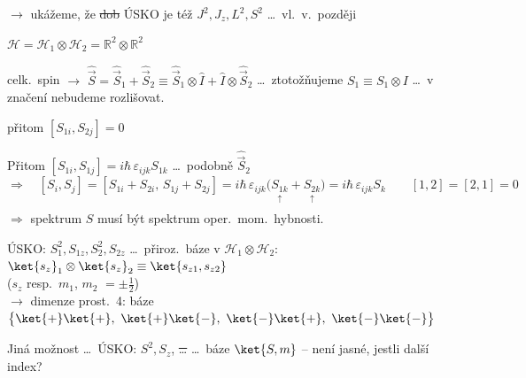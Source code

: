 $\to$ ukážeme, že \sout{dob} ÚSKO je též \quad $J^2, J_z, L^2, S^2$ \quad \dots\ vl.\ v.\ později

\begin{priklad}
$\mathcal{H} = \mathcal{H}_1\otimes\mathcal{H}_2 = \mathbb{R}^2\otimes\mathbb{R}^2$

celk.\ spin $\to$ \quad $\hat{\vec S} = \hat{\vec S}_1 + \hat{\vec S}_2 \equiv \hat{\vec S}_1\otimes\hat I + \hat I\otimes\hat{\vec S}_2$
\quad \dots\ ztotožňujeme $S_1 \equiv S_1\otimes I$ \dots\ v značení nebudeme rozlišovat.

přitom \quad $[S_{1i},S_{2j}] = 0$
\end{priklad}

\begin{priklad}
Přitom \quad $[S_{1i},S_{1j}] = i\hbar\,\varepsilon_{ijk}S_{1k}$ \quad \dots\ podobně $\hat{\vec S}_2$
\[
  \Rightarrow\quad [S_i,S_j] = [S_{1i} + S_{2i},\,S_{1j} + S_{2j}]
  = i\hbar\,\varepsilon_{ijk}\big(\underset{\substack{\uparrow\\ [1,1]}}{S_{1k}} + \underset{\substack{\uparrow\\ [2,2]}}{S_{2k}}\big)
  = i\hbar\,\varepsilon_{ijk}S_k
  \qquad [1,2] = [2,1] = 0
\]
$\Rightarrow$ spektrum $S$ musí být spektrum oper.\ mom.\ hybnosti.

ÚSKO: $S_1^2, S_{1z}, S_2^2, S_{2z}$ \dots\ přiroz.\ báze v $\mathcal{H}_1\otimes\mathcal{H}_2$: \quad
$\ket{s_z}_1\otimes\ket{s_z}_2 \equiv \ket{s_{z1},s_{z2}}$  \\
\quad ($s_z$ resp.\ $m_1$, $m_2$ $= \pm\frac12$) \\
\quad $\to$ dimenze prost.\ 4: \quad báze $\big\{\ket{+}\ket{+},\ \ket{+}\ket{-},\ \ket{-}\ket{+},\ \ket{-}\ket{-}\big\}$

Jiná možnost \dots\ ÚSKO: $S^2, S_z$, \sout{\dots} \quad \dots\ báze $\ket{S,m}$ \quad -- není jasné, jestli další index?


\end{priklad}
